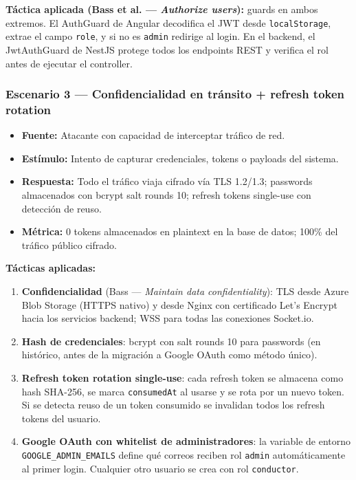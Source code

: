 \documentclass[12pt,a4paper,oneside]{article}
\begin{document}
\textbf{T\'actica aplicada (Bass et al. --- \emph{Authorize users}):} guards en ambos extremos. El AuthGuard de Angular decodifica el JWT desde \texttt{localStorage}, extrae el campo \texttt{role}, y si no es \texttt{admin} redirige al login. En el backend, el JwtAuthGuard de NestJS protege todos los endpoints REST y verifica el rol antes de ejecutar el controller.

\subsubsection{Escenario 3 --- Confidencialidad en tr\'ansito + refresh token rotation}

\begin{itemize}[leftmargin=*]
  \item \textbf{Fuente:} Atacante con capacidad de interceptar tr\'afico de red.
  \item \textbf{Est\'imulo:} Intento de capturar credenciales, tokens o payloads del sistema.
  \item \textbf{Respuesta:} Todo el tr\'afico viaja cifrado v\'ia TLS 1.2/1.3; passwords almacenados con bcrypt salt rounds 10; refresh tokens single-use con detecci\'on de reuso.
  \item \textbf{M\'etrica:} 0 tokens almacenados en plaintext en la base de datos; 100\% del tr\'afico p\'ublico cifrado.
\end{itemize}

\textbf{T\'acticas aplicadas:}
\begin{enumerate}[leftmargin=*]
  \item \textbf{Confidencialidad} (Bass --- \emph{Maintain data confidentiality}): TLS desde Azure Blob Storage (HTTPS nativo) y desde Nginx con certificado Let's Encrypt hacia los servicios backend; WSS para todas las conexiones Socket.io.
  \item \textbf{Hash de credenciales}: bcrypt con salt rounds 10 para passwords (en hist\'orico, antes de la migraci\'on a Google OAuth como m\'etodo \'unico).
  \item \textbf{Refresh token rotation single-use}: cada refresh token se almacena como hash SHA-256, se marca \texttt{consumedAt} al usarse y se rota por un nuevo token. Si se detecta reuso de un token consumido se invalidan todos los refresh tokens del usuario.
  \item \textbf{Google OAuth con whitelist de administradores}: la variable de entorno \texttt{GOOGLE\_ADMIN\_EMAILS} define qu\'e correos reciben rol \texttt{admin} autom\'aticamente al primer login. Cualquier otro usuario se crea con rol \texttt{conductor}.
\end{enumerate}
\end{document}
